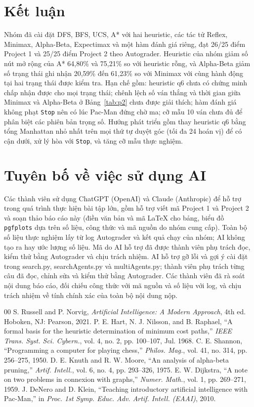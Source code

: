 \documentclass[conference]{IEEEtran}
\begin{document}
\section{Kết luận}
Nhóm đã cài đặt DFS, BFS, UCS, A* với hai heuristic, các tác tử Reflex, Minimax, Alpha-Beta, Expectimax và một hàm đánh giá riêng, đạt 26/25 điểm Project 1 và 25/25 điểm Project 2 theo Autograder. Heuristic của nhóm giảm số nút mở rộng của A* 64,80\% và 75,21\% so với heuristic rỗng, và Alpha-Beta giảm số trạng thái ghi nhận 20,59\% đến 61,23\% so với Minimax với cùng hành động tại hai trạng thái được kiểm tra. Hạn chế gồm: heuristic q6 chưa có chứng minh chấp nhận được cho mọi trạng thái; chênh lệch số ván thắng và thời gian giữa Minimax và Alpha-Beta ở Bảng~\ref{tab:p2} chưa được giải thích; hàm đánh giá không phạt \texttt{Stop} nên có lúc Pac-Man đứng chờ ma; cỡ mẫu 10 ván chưa đủ để phân biệt các phiên bản trọng số. Hướng phát triển gồm thay heuristic q6 bằng tổng Manhattan nhỏ nhất trên mọi thứ tự duyệt góc (tối đa 24 hoán vị) để có cận dưới, xử lý hòa với \texttt{Stop}, và tăng cỡ mẫu thực nghiệm.

\section*{Tuyên bố về việc sử dụng AI}
Các thành viên sử dụng ChatGPT (OpenAI) và Claude (Anthropic) để hỗ trợ trong quá trình thực hiện bài tập lớn, gồm hỗ trợ viết mã Project 1 và Project 2 và soạn thảo báo cáo này (điền văn bản và mã LaTeX cho bảng, biểu đồ \texttt{pgfplots} dựa trên số liệu, công thức và mã nguồn do nhóm cung cấp). Toàn bộ số liệu thực nghiệm lấy từ log Autograder và kết quả chạy của nhóm; AI không tạo ra hay ước lượng số liệu. Mã do AI hỗ trợ đã được thành viên phụ trách đọc, kiểm thử bằng Autograder và chịu trách nhiệm. AI hỗ trợ gỡ lỗi và gợi ý cài đặt trong search.py, searchAgents.py và multiAgents.py; thành viên phụ trách từng câu đã đọc, chỉnh sửa và kiểm thử bằng Autograder. Các thành viên đã rà soát nội dung báo cáo, đối chiếu công thức với mã nguồn và số liệu với log, và chịu trách nhiệm về tính chính xác của toàn bộ nội dung nộp.

\renewcommand{\refname}{Tài liệu tham khảo}
\begin{thebibliography}{00}
 S. Russell and P. Norvig, \textit{Artificial Intelligence: A Modern Approach}, 4th ed. Hoboken, NJ: Pearson, 2021.
 P. E. Hart, N. J. Nilsson, and B. Raphael, ``A formal basis for the heuristic determination of minimum cost paths,'' \textit{IEEE Trans. Syst. Sci. Cybern.}, vol. 4, no. 2, pp. 100--107, Jul. 1968.
 C. E. Shannon, ``Programming a computer for playing chess,'' \textit{Philos. Mag.}, vol. 41, no. 314, pp. 256--275, 1950.
 D. E. Knuth and R. W. Moore, ``An analysis of alpha-beta pruning,'' \textit{Artif. Intell.}, vol. 6, no. 4, pp. 293--326, 1975.
 E. W. Dijkstra, ``A note on two problems in connexion with graphs,'' \textit{Numer. Math.}, vol. 1, pp. 269--271, 1959.
 J. DeNero and D. Klein, ``Teaching introductory artificial intelligence with Pac-Man,'' in \textit{Proc. 1st Symp. Educ. Adv. Artif. Intell. (EAAI)}, 2010.
\end{thebibliography}
\end{document}
